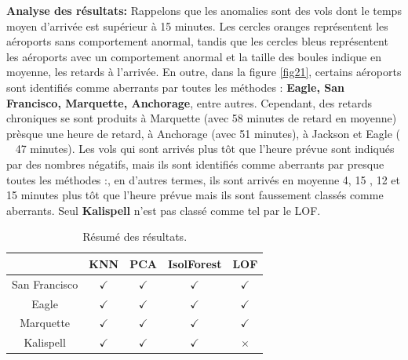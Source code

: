 \noindent\textbf{Analyse des résultats:} 
Rappelons que les anomalies sont des vols dont le temps moyen d'arrivée est supérieur à 15 minutes. Les cercles oranges représentent les aéroports sans comportement anormal, tandis que les cercles bleus représentent les aéroports avec un comportement anormal et la taille des boules indique en moyenne, les retards à l'arrivée. En outre, dans la figure \ref{fig21}, certains aéroports sont identifiés comme aberrants par toutes les méthodes : \textbf{Eagle, San Francisco, Marquette, Anchorage}, entre autres. Cependant, des retards chroniques se sont produits à Marquette (avec 58 minutes de retard en moyenne) prèsque une heure de retard, à Anchorage (avec 51 minutes), à Jackson et Eagle ( ~ 47 minutes). Les vols qui sont arrivés plus tôt que l'heure prévue sont indiqués par des nombres négatifs, mais ils sont identifiés comme aberrants par presque toutes les méthodes :, en d'autres termes, ils sont arrivés en moyenne 4, 15 , 12 et 15 minutes plus tôt que l'heure prévue mais ils sont faussement classés comme aberrants. Seul \textbf{Kalispell} n'est pas classé comme tel par le LOF. 
\begin{table}[t!]
\centering
 \begin{tabular}{||c c c c c||} 
 \hline
 &  KNN & PCA & IsolForest & LOF\\ [0.5ex] 
 \hline\hline
San Francisco & $\checkmark$ & $\checkmark$  & $\checkmark$ & $\checkmark$ \\ 
 Eagle & $\checkmark$ & $\checkmark$  & $\checkmark$ & $\checkmark$ \\
Marquette & $\checkmark$ & $\checkmark$  & $\checkmark$ & $\checkmark$ \\
 Kalispell & $\checkmark$ & $\checkmark$  & $\checkmark$ & $\times$ \\ [1ex] 
 \hline
 \end{tabular}
 \caption{Résumé des résultats.}
 \label{fig2w}
\end{table}

\afterpage{\FloatBarrier}

%
%

